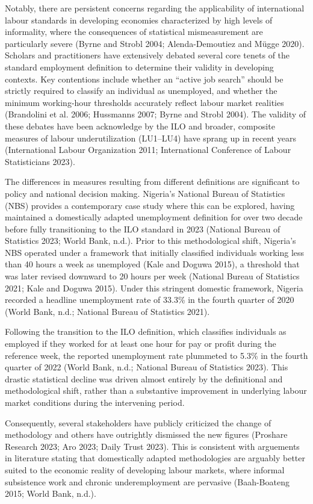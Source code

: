\documentclass[
  letterpaper,
  DIV=11,
  numbers=noendperiod]{scrartcl}
\begin{document}
Notably, there are persistent concerns regarding the applicability of
international labour standards in developing economies characterized by
high levels of informality, where the consequences of statistical
mismeasurement are particularly severe (Byrne and Strobl 2004;
Alenda-Demoutiez and Mügge 2020). Scholars and practitioners have
extensively debated several core tenets of the standard employment
definition to determine their validity in developing contexts. Key
contentions include whether an ``active job search'' should be strictly
required to classify an individual as unemployed, and whether the
minimum working-hour thresholds accurately reflect labour market
realities (Brandolini et al. 2006; Hussmanns 2007; Byrne and Strobl
2004). The validity of these debates have been acknowledge by the ILO
and broader, composite measures of labour underutilization (LU1--LU4)
have sprang up in recent years (International Labour Organization 2011;
International Conference of Labour Statisticians 2023).

The differences in measures resulting from different definitions are
significant to policy and national decision making. Nigeria's National
Bureau of Statistics (NBS) provides a contemporary case study where this
can be explored, having maintained a domestically adapted unemployment
definition for over two decade before fully transitioning to the ILO
standard in 2023 (National Bureau of Statistics 2023; World Bank, n.d.).
Prior to this methodological shift, Nigeria's NBS operated under a
framework that initially classified individuals working less than 40
hours a week as unemployed (Kale and Doguwa 2015), a threshold that was
later revised downward to 20 hours per week (National Bureau of
Statistics 2021; Kale and Doguwa 2015). Under this stringent domestic
framework, Nigeria recorded a headline unemployment rate of 33.3\% in
the fourth quarter of 2020 (World Bank, n.d.; National Bureau of
Statistics 2021).

Following the transition to the ILO definition, which classifies
individuals as employed if they worked for at least one hour for pay or
profit during the reference week, the reported unemployment rate
plummeted to 5.3\% in the fourth quarter of 2022 (World Bank, n.d.;
National Bureau of Statistics 2023). This drastic statistical decline
was driven almost entirely by the definitional and methodological shift,
rather than a substantive improvement in underlying labour market
conditions during the intervening period.

Consequently, several stakeholders have publicly criticized the change
of methodology and others have outrightly dismissed the new figures
(Proshare Research 2023; Aro 2023; Daily Trust 2023). This is consistent
with arguements in literature stating that domestically adapted
methodologies are arguably better suited to the economic reality of
developing labour markets, where informal subsistence work and chronic
underemployment are pervasive (Baah-Boateng 2015; World Bank, n.d.).
\end{document}
